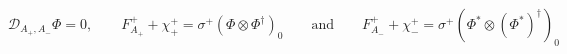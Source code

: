 \begin{equation}
 \mathcal{D}_{A_+,A_-}\Phi=0,\qquad
 F^+_{A_+}+\chi^+_+=\sigma^+(\Phi\otimes\Phi^\dagger)_0
 \qquad\text{and}\qquad
 F^+_{A_-}+\chi^+_-=\sigma^+(\Phi^*\otimes(\Phi^*)^\dagger)_0
\end{equation}

